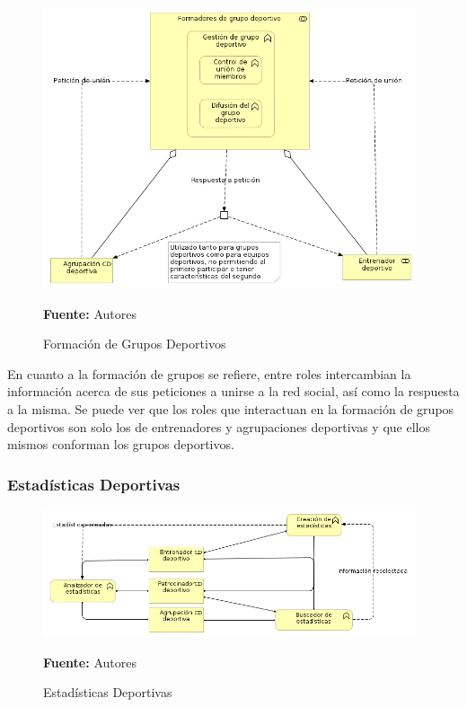 \begin{figure}[!htb]
  \begin{center}
    \includegraphics[width=11cm]{./imagenes/business_functions/formaciongruposdeportivos.png}
    \caption{Formación de Grupos Deportivos}
    \label{fig:bf_formacion_grupos_deportivos}
    \textbf{Fuente:}  Autores
  \end{center}
\end{figure}

En cuanto a la formación de grupos se refiere, entre roles intercambian la información acerca de sus peticiones a unirse a la red social, así como la respuesta a la misma. Se puede ver que los roles que interactuan en la formación de grupos deportivos son solo los de entrenadores y agrupaciones deportivas y que ellos mismos conforman los grupos deportivos.

\subsubsection{Estadísticas Deportivas}

\begin{figure}[!htb]
  \begin{center}
    \includegraphics[width=11cm]{./imagenes/business_functions/estadisticasdeportivas.png}
    \caption{Estadísticas Deportivas}
    \label{fig:bf_estadisticas_deportivas}
    \textbf{Fuente:}  Autores
  \end{center}
\end{figure}

